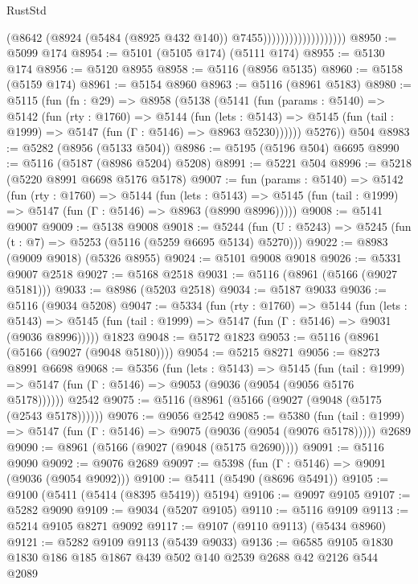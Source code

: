 \begin{lexlean}{RustStd}
\begin{coremodule}
                                      (@8642
                                        (@8924 (@5484 (@8925 @432 @140)) @7455)))))))))))))))))))
@8950 := @5099 @174
@8954 := @5101 (@5105 @174) (@5111 @174)
@8955 := @5130 @174
@8956 := @5120 @8955
@8958 := @5116 (@8956 @5135)
@8960 := @5158 (@5159 @174)
@8961 := @5154 @8960
@8963 := @5116 (@8961 @5183)
@8980 := @5115
    (fun (fn : @29) =>
    @8958
      (@5138
        (@5141
          (fun (params : @5140) =>
          @5142
            (fun (rty : @1760) =>
            @5144
              (fun (lets : @5143) =>
              @5145 (fun (tail : @1999) => @5147 (fun (Γ : @5146) => @8963 @5230))))))
        @5276))
    @504
@8983 := @5282 (@8956 (@5133 @504))
@8986 := @5195 (@5196 @504) @6695
@8990 := @5116 (@5187 (@8986 @5204) @5208)
@8991 := @5221 @504
@8996 := @5218 (@5220 @8991 @6698 @5176 @5178)
@9007 := fun (params : @5140) =>
  @5142
    (fun (rty : @1760) =>
    @5144
      (fun (lets : @5143) =>
      @5145 (fun (tail : @1999) => @5147 (fun (Γ : @5146) => @8963 (@8990 @8996)))))
@9008 := @5141 @9007
@9009 := @5138 @9008
@9018 := @5244 (fun (U : @5243) => @5245 (fun (t : @7) => @5253 (@5116 (@5259 @6695 @5134) @5270)))
@9022 := @8983 (@9009 @9018) (@5326 @8955)
@9024 := @5101 @9008 @9018
@9026 := @5331 @9007 @2518
@9027 := @5168 @2518
@9031 := @5116 (@8961 (@5166 (@9027 @5181)))
@9033 := @8986 (@5203 @2518)
@9034 := @5187 @9033
@9036 := @5116 (@9034 @5208)
@9047 := @5334
    (fun (rty : @1760) =>
    @5144
      (fun (lets : @5143) =>
      @5145 (fun (tail : @1999) => @5147 (fun (Γ : @5146) => @9031 (@9036 @8996)))))
    @1823
@9048 := @5172 @1823
@9053 := @5116 (@8961 (@5166 (@9027 (@9048 @5180))))
@9054 := @5215 @8271
@9056 := @8273 @8991 @6698
@9068 := @5356
    (fun (lets : @5143) =>
    @5145
      (fun (tail : @1999) => @5147 (fun (Γ : @5146) => @9053 (@9036 (@9054 (@9056 @5176 @5178))))))
    @2542
@9075 := @5116 (@8961 (@5166 (@9027 (@9048 (@5175 (@2543 @5178))))))
@9076 := @9056 @2542
@9085 := @5380
    (fun (tail : @1999) => @5147 (fun (Γ : @5146) => @9075 (@9036 (@9054 (@9076 @5178)))))
    @2689
@9090 := @8961 (@5166 (@9027 (@9048 (@5175 @2690))))
@9091 := @5116 @9090
@9092 := @9076 @2689
@9097 := @5398 (fun (Γ : @5146) => @9091 (@9036 (@9054 @9092)))
@9100 := @5411 (@5490 (@8696 @5491))
@9105 := @9100 (@5411 (@5414 (@8395 @5419)) @5194)
@9106 := @9097 @9105
@9107 := @5282 @9090
@9109 := @9034 (@5207 @9105)
@9110 := @5116 @9109
@9113 := @5214 @9105 @8271 @9092
@9117 := @9107 (@9110 @9113) (@5434 @8960)
@9121 := @5282 @9109 @9113 (@5439 @9033)
@9136 := @6585 @9105 @1830 @1830 @186 @185 @1867 @439 @502 @140 @2539 @2688 @42 @2126 @544 @2089

\end{coremodule}
\end{lexlean}
